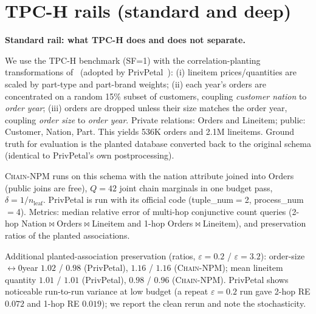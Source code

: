\documentclass[sigconf, nonacm]{acmart}
\newcommand{\chainnpm}{\textsc{Chain-NPM}\xspace}
\begin{document}
\section{TPC-H rails (standard and deep)}
\label{app:tpch-rails}

\textbf{Standard rail: what TPC-H does and does not separate.} \label{app:tpch}

We use the TPC-H benchmark (SF=1) with the correlation-planting
transformations of~\cite{cai2023privlava} (adopted by
PrivPetal~\cite{cai2025privpetal}): (i) lineitem prices/quantities are
scaled by part-type and part-brand weights; (ii) each year's orders are
concentrated on a random 15\% subset of customers, coupling
\emph{customer nation} to \emph{order year}; (iii) orders are dropped
unless their size matches the order year, coupling \emph{order size} to
\emph{order year}. Private relations: Orders and Lineitem; public:
Customer, Nation, Part. This yields 536K orders and 2.1M lineitems.
Ground truth for evaluation is the planted database converted back to the
original schema (identical to PrivPetal's own postprocessing).

\chainnpm runs on this schema with the nation attribute joined into Orders
(public joins are free), $Q{=}42$ joint chain marginals in one budget pass,
$\delta=1/n_{\mathrm{leaf}}$. PrivPetal is run with its official code
(tuple\_num$=$2, process\_num$=$4). Metrics: median relative error of
multi-hop conjunctive count queries (2-hop Nation$\Join$Orders$\Join$Lineitem
and 1-hop Orders$\Join$Lineitem), and preservation ratios of the planted
associations.

\noindent Additional planted-association preservation (ratios,
$\varepsilon{=}0.2$ / $\varepsilon{=}3.2$): order-size$\leftrightarrow$\penalty0year
$1.02$ / $0.98$ (PrivPetal), $1.16$ / $1.16$ (\chainnpm); mean lineitem
quantity $1.01$ / $1.01$ (PrivPetal), $0.98$ / $0.96$ (\chainnpm).
PrivPetal shows noticeable run-to-run variance at low budget (a repeat
$\varepsilon{=}0.2$ run gave 2-hop RE $0.072$ and 1-hop RE $0.019$);
we report the clean rerun and note the stochasticity.
\end{document}
